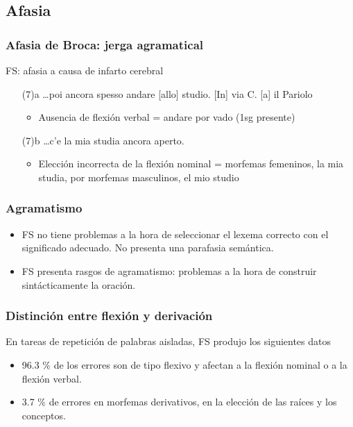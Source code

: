 \documentclass[compress]{beamer}
\begin{document}
	\begin{frame}
	\subsection{Afasia}
	\frametitle{Afasia de Broca: jerga agramatical}

	FS: afasia a causa de infarto cerebral
	\begin{enumerate}
	\item[(7)a] \ldots poi ancora spesso \alert{andare} [allo] studio. [In] via C. [a] il Pariolo
	\begin{itemize}
	  \item Ausencia de flexión verbal = \alert{andare} por \alert{vado} (1sg presente)
	\end{itemize}
	\item[(7)b] \ldots c'e \alert{la mia studia} ancora aperto.
	\begin{itemize}
	  \item Elección incorrecta de la flexión nominal = morfemas
	  femeninos, l\alert{a} mi\alert{a} studi\alert{a}, por morfemas masculinos, \alert{e}l mi\alert{o} studi\alert{o}
	\end{itemize}
	\end{enumerate}

	\end{frame}



	\begin{frame}
	\frametitle{Agramatismo}
	\begin{itemize}
	\item FS no tiene problemas a la hora de seleccionar el lexema
	correcto con el significado adecuado. No presenta una parafasia
	semántica.

	\item FS presenta rasgos de agramatismo: problemas a la hora de
	construir sintácticamente la oración.
	\end{itemize}

	\end{frame}


	\begin{frame}
	\frametitle{Distinción entre flexión y derivación} En tareas de
	repetición de palabras aisladas, FS produjo los siguientes datos

	\begin{itemize}
	\item 96.3 \% de los errores son de tipo flexivo y afectan a la
	flexión nominal o a la flexión verbal.

	\item 3.7 \% de errores en morfemas derivativos, en la elección de
	las raíces y los conceptos.
	\end{itemize}

	\end{frame}
\end{document}
